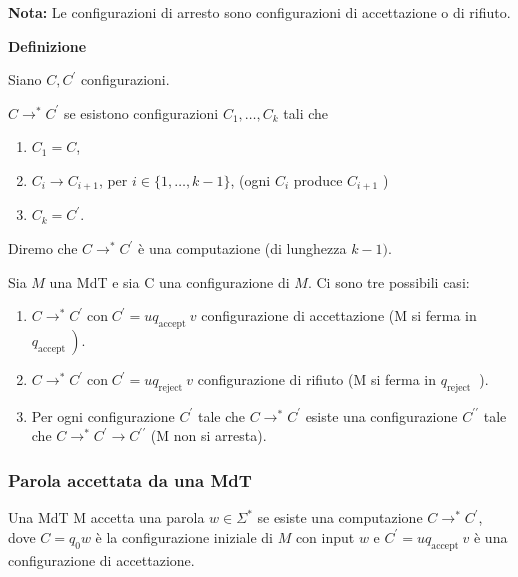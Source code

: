 \textbf{Nota:} Le configurazioni di arresto sono configurazioni di accettazione o di rifiuto.

\vspace{5mm}

\textbf{Definizione}

Siano $C, C^{\prime}$ configurazioni.

$C \rightarrow^{*} C^{\prime}$ se esistono configurazioni $C_{1}, \ldots, C_{k}$ tali che
\begin{enumerate}
    \item $C_{1}=C$,
    \item $C_{i} \rightarrow C_{i+1}$, per $i \in\{1, \ldots, k-1\}$,
(ogni $C_{i}$ produce $C_{i+1}$ )
    \item $C_{k}=C^{\prime}$.
\end{enumerate}

Diremo che $C \rightarrow^{*} C^{\prime}$ è una computazione (di lunghezza $k-1) .$

\vspace{5mm}

Sia $M$ una MdT e sia C una configurazione di $M$. Ci sono tre possibili casi:
\begin{enumerate}
    \item $C \rightarrow^{*} C^{\prime} \operatorname{con} C^{\prime}=u q_{\text {accept }} v$ configurazione di accettazione (M si ferma in $\left.q_{\text {accept }}\right)$.
    \item$C \rightarrow^{*} C^{\prime} \operatorname{con} C^{\prime}=u q_{\text {reject }} v$ configurazione di rifiuto (M si ferma in $q_{\text {reject }}$ ).
    \item Per ogni configurazione $C^{\prime}$ tale che $C \rightarrow^{*} C^{\prime}$ esiste una configurazione $C^{\prime \prime}$ tale che $C \rightarrow^{*} C^{\prime} \rightarrow C^{\prime \prime}$ (M non si arresta).
\end{enumerate}

\subsubsection{Parola accettata da una MdT}

Una MdT M accetta una parola $w \in \Sigma^{*}$ se esiste una computazione $C \rightarrow^{*} C^{\prime}$, dove $C=q_{0} w$ è la configurazione iniziale di $M$ con input $w$ e $C^{\prime}=u q_{\text {accept }} v$ è una configurazione di accettazione.

\vspace{5mm}

